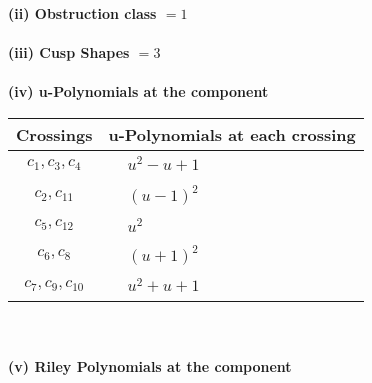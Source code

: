 \documentclass[1p]{elsarticle_modified}
\theoremstyle{definition}
\begin{document}
\flushleft \textbf{(ii) Obstruction class $= 1$}\\~\\
\flushleft \textbf{(iii) Cusp Shapes $= 3$}\\~\\
\newpage\renewcommand{\arraystretch}{1}
\flushleft \textbf{(iv) u-Polynomials at the component}\newline \\
\begin{tabular}{m{50pt}|m{274pt}}
Crossings & \hspace{64pt}u-Polynomials at each crossing \\
\hline $$\begin{aligned}c_{1},c_{3},c_{4}\end{aligned}$$&$\begin{aligned}
&u^2- u+1
\end{aligned}$\\
\hline $$\begin{aligned}c_{2},c_{11}\end{aligned}$$&$\begin{aligned}
&(u-1)^2
\end{aligned}$\\
\hline $$\begin{aligned}c_{5},c_{12}\end{aligned}$$&$\begin{aligned}
&u^2
\end{aligned}$\\
\hline $$\begin{aligned}c_{6},c_{8}\end{aligned}$$&$\begin{aligned}
&(u+1)^2
\end{aligned}$\\
\hline $$\begin{aligned}c_{7},c_{9},c_{10}\end{aligned}$$&$\begin{aligned}
&u^2+u+1
\end{aligned}$\\
\hline
\end{tabular}\\~\\
\newpage\renewcommand{\arraystretch}{1}
\flushleft \textbf{(v) Riley Polynomials at the component}\newline \\
\end{document}

